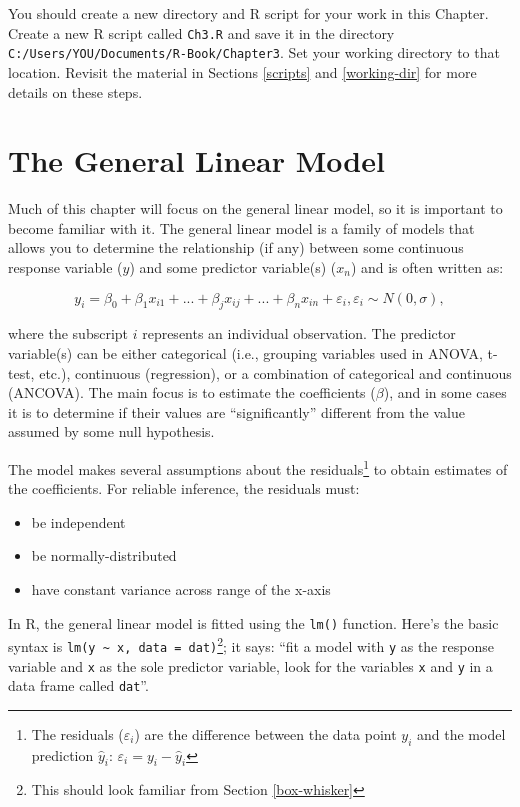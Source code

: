 \documentclass[]{book}
\providecommand{\tightlist}{%
  \setlength{\itemsep}{0pt}\setlength{\parskip}{0pt}}
\let\rmarkdownfootnote\footnote%
\def\footnote{\protect\rmarkdownfootnote}
\theoremstyle{definition}
\theoremstyle{definition}
\theoremstyle{definition}
\theoremstyle{remark}
\begin{document}
You should create a new directory and R script for your work in this
Chapter. Create a new R script called \texttt{Ch3.R} and save it in the
directory \texttt{C:/Users/YOU/Documents/R-Book/Chapter3}. Set your
working directory to that location. Revisit the material in Sections
\ref{scripts} and \ref{working-dir} for more details on these steps.

\section{The General Linear Model}\label{lm}

Much of this chapter will focus on the general linear model, so it is
important to become familiar with it. The general linear model is a
family of models that allows you to determine the relationship (if any)
between some continuous response variable (\(y\)) and some predictor
variable(s) (\(x_n\)) and is often written as:

\begin{equation}
  y_i=\beta_0 + \beta_1 x_{i1} + ... + \beta_j x_{ij}+ ... + \beta_n x_{in} + \varepsilon_i, \varepsilon_i \sim N(0,\sigma),
\label{eq:lin-mod}
\end{equation}

where the subscript \(i\) represents an individual observation. The
predictor variable(s) can be either categorical (i.e., grouping
variables used in ANOVA, t-test, etc.), continuous (regression), or a
combination of categorical and continuous (ANCOVA). The main focus is to
estimate the coefficients (\(\beta\)), and in some cases it is to
determine if their values are ``significantly'' different from the value
assumed by some null hypothesis.

The model makes several assumptions about the residuals\footnote{The
  residuals (\(\varepsilon_i\)) are the difference between the data
  point \(y_i\) and the model prediction \(\hat{y}_i\):
  \(\varepsilon_i=y_i-\hat{y}_i\)} to obtain estimates of the
coefficients. For reliable inference, the residuals must:

\begin{itemize}
\tightlist
\item
  be independent
\item
  be normally-distributed
\item
  have constant variance across range of the x-axis
\end{itemize}

In R, the general linear model is fitted using the \texttt{lm()}
function. Here's the basic syntax is
\texttt{lm(y\ \textasciitilde{}\ x,\ data\ =\ dat)}\footnote{This should
  look familiar from Section \ref{box-whisker}}; it says: ``fit a model
with \texttt{y} as the response variable and \texttt{x} as the sole
predictor variable, look for the variables \texttt{x} and \texttt{y} in
a data frame called \texttt{dat}''.
\end{document}
